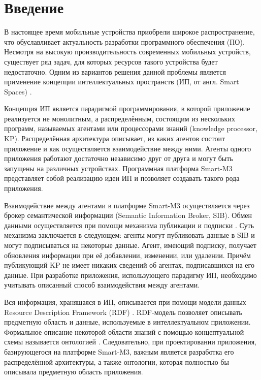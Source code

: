 \chapter*{Введение}

В настоящее время мобильные устройства приобрели широкое распространение, что обуславливает актуальность разработки программного обеспечения (ПО). Несмотря на высокую производительность современных мобильных устройств, существует ряд задач, для которых ресурсов такого устройства будет недостаточно. Одним из вариантов решения данной проблемы является применение концепции интеллектуальных пространств (ИП, от англ. Smart Spaces) \cite{oliver:dynamic}.

Концепция ИП является парадигмой программирования, в которой приложение реализуется не монолитным, а распределённым, состоящим из нескольких программ, называемых агентами или процессорами знаний (knowledge processor, KP). Распределённая архитектура описывает, из каких агентов состоит приложение и как осуществляется взаимодействие между ними. Агенты
одного приложения работают достаточно независимо друг от друга и могут быть запущены на различных устройствах.
Программная платформа Smart-M3 \cite{honkola:smart-m3} представляет собой реализацию идеи ИП и позволяет создавать такого рода приложения. 

Взаимодействие между агентами в платформе Smart-M3 осуществляется через брокер семантической информации (Semantic Information Broker, SIB). Обмен данными осуществляется при помощи механизма публикации и подписки \cite{baldoni:evolution}. Суть механизма заключается
в следующем: агенты могут публиковать данные в SIB и могут подписываться на некоторые данные.
Агент, имеющий подписку, получает обновления информации при её добавлении, изменении, или удалении. Причём публикующий KP не имеет никаких сведений об агентах, подписавшихся на его данные. При разработке приложения, использующего парадигму ИП, необходимо учитывать описанный способ взаимодействия между агентами.

Вся информация, хранящаяся в ИП, описывается при помощи модели данных Resource Description Framework (RDF) \cite{rdf}. 
RDF-модель позволяет описывать предметную область и данные, используемые в интеллектуальном приложении.
Формальное описание некоторой области знаний с помощью концептуальной схемы называется онтологией \cite{guarino}. Следовательно, при проектировании приложения, базирующегося на платформе Smart-M3, важным является разработка его распределённой архитектуры, а также онтологии, которая полностью бы описывала предметную область приложения.

